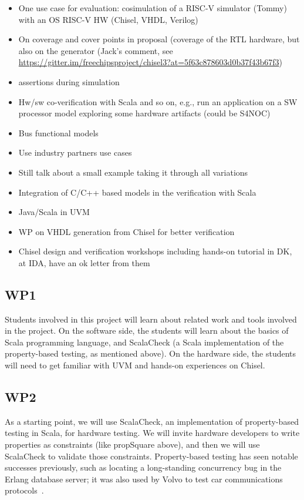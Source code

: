 \documentclass[fleqn,12pt]{article}
\begin{document}
\begin{itemize}
\item One use case for evaluation: cosimulation of a RISC-V simulator (Tommy) with an OS RISC-V HW (Chisel, VHDL, Verilog)
\item On coverage and cover points in proposal (coverage of the RTL hardware, but also on the generator (Jack's comment, see \url{https://gitter.im/freechipsproject/chisel3?at=5f63c878603d0b37f43b67f3})
\item assertions during simulation
\item Hw/sw co-verification with Scala and so on, e.g., run an application on a SW processor model exploring some hardware artifacts (could be S4NOC)
\item Bus functional models
\item Use industry partners use cases
\item Still talk about a small example taking it through all variations
\item Integration of C/C++ based models in the verification with Scala
\item Java/Scala in UVM
\item WP on VHDL generation from Chisel for better verification
\item Chisel design and verification workshops including hands-on tutorial in DK, at IDA, have an ok letter from them
\end{itemize}

\subsection{WP1}
Students involved in this project will learn about related work and
tools involved in the project. On the software side, the students will learn
about the basics of Scala programming language, and ScalaCheck (a
Scala implementation of the property-based testing, as mentioned
above). On the hardware side, the students will need to get familiar with UVM
and hands-on experiences on Chisel.


\subsection{WP2} 
As a starting point, we will use ScalaCheck, an implementation of
property-based testing in Scala, for hardware testing. We will invite
hardware developers to write properties as constraints (like
propSquare above), and then we will use ScalaCheck to validate those
constraints. Property-based testing has seen notable
successes previously, such as locating a long-standing concurrency bug
in the Erlang database server; it was also used by Volvo to test car
communications protocols~\cite{DBLP:conf/icse/HughesNSA16}.
\end{document}
